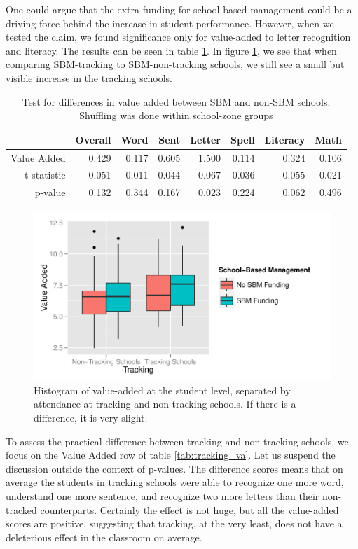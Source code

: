 \documentclass[11pt]{article}
\begin{document}
One could argue that the extra funding for school-based management could be a driving force behind the increase in student performance.  However, when we tested the claim, we found significance only for value-added to letter recognition and literacy.  The results can be seen in table \ref{tab:sbm}.  In figure \ref{fig:ValueAddedTrackSBM}, we see that when comparing SBM-tracking to SBM-non-tracking schools, we still see a small but visible increase in the tracking schools.

\begin{table}[ht]
	\centering
	\begin{tabular}{rrrrrrrr}
		\hline
		& Overall & Word & Sent & Letter & Spell & Literacy & Math \\ 
		\hline
		Value Added & 0.429 & 0.117 & 0.605 & 1.500 & 0.114 & 0.324 & 0.106 \\ 
		t-statistic & 0.051 & 0.011 & 0.044 & 0.067 & 0.036 & 0.055 & 0.021 \\ 
		p-value & 0.132 & 0.344 & 0.167 & 0.023 & 0.224 & 0.062 & 0.496 \\ 
		\hline
	\end{tabular}
	\caption{Test for differences in value added between SBM and non-SBM schools.  
		Shuffling was done within school-zone groups} 
	\label{tab:sbm}
\end{table}

  \begin{figure}[H]
  	\centering
  	\includegraphics[scale=0.8]{../Figures/ValueAddedTrackSBM.pdf}
  	\caption{Histogram of value-added at the student level, separated by attendance at tracking and non-tracking schools.  If there is a difference, it is very slight.}
  	\label{fig:ValueAddedTrackSBM}
  \end{figure} 

To assess the practical difference between tracking and non-tracking schools, we focus on the Value Added row of table \ref{tab:tracking_va}.  Let us suspend the discussion outside the context of p-values.  The difference scores means that on average the students in tracking schools were able to recognize one more word, understand one more sentence, and recognize two more letters than their non-tracked counterparts.  Certainly the effect is not huge, but all the value-added scores are positive, suggesting that tracking, at the very least, does not have a deleterious effect in the classroom on average.
\end{document}
